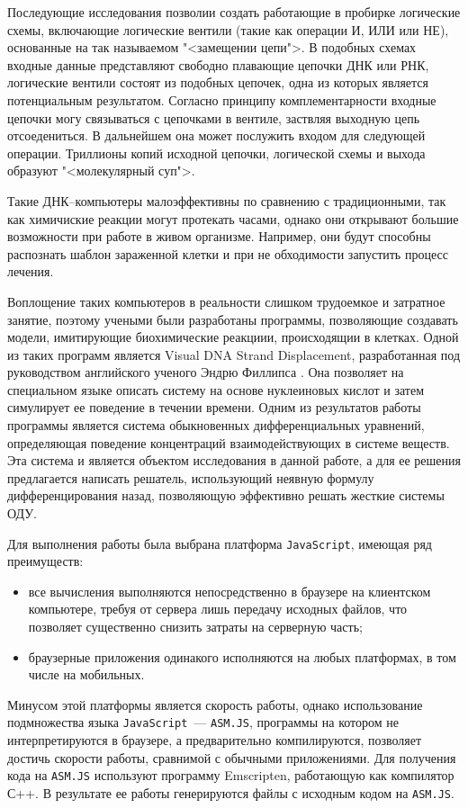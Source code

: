 \documentclass[oneside,final,14pt]{extreport}
\begin{document}
	Последующие исследования позволии создать работающие в пробирке логические схемы, включающие логические вентили (такие как операции И, ИЛИ или НЕ), основанные на так называемом "<замещении цепи">. В подобных схемах входные данные представляют свободно плавающие цепочки ДНК или РНК, логические вентили состоят из подобных цепочек, одна из которых является потенциальным результатом. Согласно принципу комплементарности входные цепочки могу связываться с цепочками в вентиле, заствляя выходную цепь отсоедениться. В дальнейшем она может послужить входом для следующей операции. Триллионы копий исходной цепочки, логической схемы и выхода образуют "<молекулярный суп">.
	
	Такие ДНК--компьютеры малоэффективны по сравнению с традиционными, так как химичиские реакции могут протекать часами, однако они открывают большие возможности при работе в живом организме. Например, они будут способны распознать шаблон зараженной клетки и при не обходимости запустить процесс лечения.
	
	Воплощение таких компьютеров в реальности слишком трудоемкое и затратное занятие, поэтому учеными были разработаны программы, позволяющие создавать модели, имитирующие биохимические реакциии, происходящии в клетках. Одной из таких программ является Visual DNA Strand Displacement, разработанная под руководством английского ученого Эндрю Филлипса \cite{soup}. Она позволяет на специальном языке описать систему на основе нуклеиновых кислот и затем симулирует ее поведение в течении времени. Одним из результатов работы программы является система обыкновенных дифференциальных уравнений, определяющая поведение концентраций взаимодействующих в системе веществ. Эта система и является объектом исследования в данной работе, а для ее решения предлагается написать решатель, использующий неявную формулу дифференцирования назад, позволяющую эффективно решать жесткие системы ОДУ.
	
	Для выполнения работы была выбрана платформа \texttt{JavaScript}, имеющая ряд преимуществ:
\begin{itemize}
\item все вычисления выполняются непосредственно в браузере на клиентском компьютере, требуя от сервера лишь передачу исходных файлов, что позволяет существенно снизить затраты на серверную часть;
\item браузерные приложения одинакого исполняются на любых платформах, в том числе на мобильных.
\end{itemize}
Минусом этой платформы является скорость работы, однако использование подмножества языка \texttt{JavaScript}~--- \texttt{ASM.JS}, программы на котором не интерпретируются в браузере, а предварительно компилируются, позволяет достичь скорости работы, сравнимой с обычными приложениями. Для получения кода на \texttt{ASM.JS} используют программу Emscripten, работающую как компилятор С++. В результате ее работы генерируются файлы с исходным кодом на \texttt{ASM.JS}.
\end{document}
